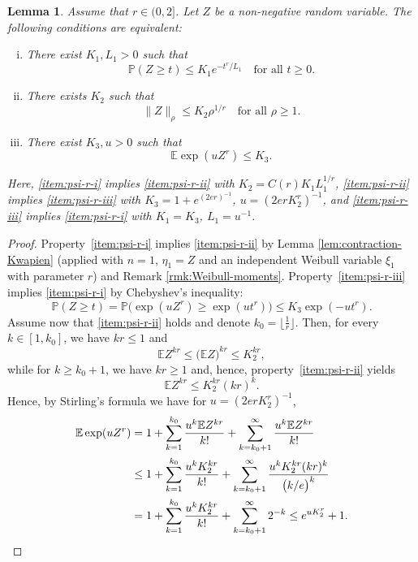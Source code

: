 \documentclass[a4paper]{amsart}
\newtheorem{lemma}[theorem]{Lemma}
\theoremstyle{definition}
\theoremstyle{remark}
\numberwithin{equation}{section}
\newcommand*{\EE}{\mathbb{E}}
\newcommand*{\PP}{\mathbb{P}}
\newcommand*{\prho}{\rho} %
\begin{document}
\begin{lemma}
	\label{lem:psi-r-equivalence}
	Assume that  $r\in(0,2]$.
	Let $Z$ be a non-negative random variable. The following conditions are equivalent:
	\begin{enumerate}[(i)]
		\item\label{item:psi-r-i}
		There exist $K_1,L_1>0$  such that
		\[
		\PP(Z\geq t) \leq K_1 e^{- t^r/ L_1} \quad \text{for all } t\geq 0.
		\]
		\item\label{item:psi-r-ii}
		There exists $K_2$ such that
		\[
		\|Z\|_{\prho{}} \leq K_2 \prho{}^{1/r} \quad \text{for all } \prho{} \geq 1.
		\]
		\item\label{item:psi-r-iii}
		There exist $K_3, u>0$ such that
		\[
		\EE\exp(u Z^r) \leq K_3.
		\]
	\end{enumerate}	
Here,
\ref{item:psi-r-i} implies \ref{item:psi-r-ii} with $K_2 = C(r)K_1L_1^{1/r}$,
\ref{item:psi-r-ii} implies \ref{item:psi-r-iii} with $K_3 = 1+e^{(2e r)^{-1}}$, $u=(2erK_2^r)^{-1}$,
 and
\ref{item:psi-r-iii} implies \ref{item:psi-r-i} with $K_1 = K_3$, $L_1=u^{-1}$.
	\end{lemma}

\begin{proof}
	Property~\ref{item:psi-r-i} implies \ref{item:psi-r-ii} by Lemma \ref{lem:contraction-Kwapien} (applied with $n=1$, $\eta_1=Z$ and an independent Weibull variable $\xi_1$ with parameter $r$) and Remark \ref{rmk:Weibull-moments}. Property~\ref{item:psi-r-iii} implies \ref{item:psi-r-i} by Chebyshev's inequality:
	\[
		\PP(Z\geq t)=\PP\bigl(\exp(uZ^r)\geq \exp(ut^r)\bigr) \le K_3	 \exp(-ut^r).
	\]
	Assume now that \ref{item:psi-r-ii} holds and denote  $k_0 = \lfloor \frac 1r \rfloor$.
	Then, for every $k\in[1,k_0]$, we have $kr\leq 1$ and
    \[
    \EE Z^{kr}  \leq (\EE Z\bigr)^{kr} \leq K_2^{kr},
	\]
	while for  $k\geq k_0+1 $, we have $kr \geq 1$ and, hence, property~\ref{item:psi-r-ii} yields
	\[
	\EE Z^{kr} \leq K_2^{kr}(kr)^k.
	\]
    Hence, by  Stirling's formula we have for $u=(2erK_2^r)^{-1}$,
		\begin{align*}
		\EE \exp(uZ^r)
		&= 1 + \sum_{k=1}^{k_0} \frac{u^k \EE Z^{kr}}{k!}  + \sum_{k=k_0+1}^\infty \frac{u^k \EE Z^{kr}}{k!} \\
		&\leq 1 + \sum_{k=1}^{k_0} \frac{u^k K_2^{kr}}{k!}  + \sum_{k=k_0+1}^\infty \frac{u^k K_2^{kr}(kr)^k }{\bigl(k/e\bigr)^k} \\
		&= 1 + \sum_{k=1}^{k_0} \frac{u^kK_2^{kr}}{k!}  + \sum_{k=k_0+1}^\infty 2^{-k}
		\leq e^{uK_2^r} +1. \qedhere
		\end{align*}	
\end{proof}
\end{document}
